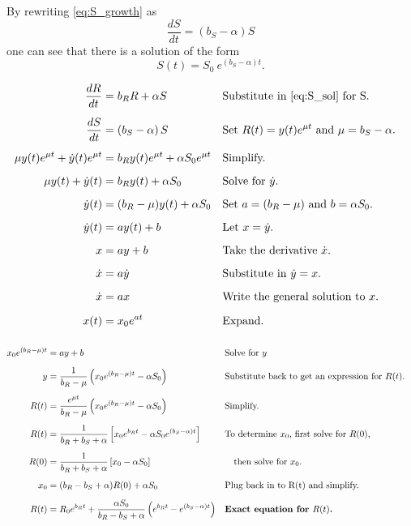\documentclass[oneside]{labbook}
\begin{document}
By rewriting \eqref{eq:S_growth} as
\begin{equation*}
\frac{dS}{dt} = \left( b_S - \alpha \right) S
\end{equation*}
one can see that there is a solution of the form
\begin{equation}\label{eq:S_sol}
S(t) = S_0\:e^{\left(b_S - \alpha\right) t}.
\end{equation}


\begin{align*}
  \frac{dR}{dt} &= b_R R + \alpha S  &&
      \text{Substitute in \eqref{eq:S_sol} for S.} &\\[1.25ex]
  \frac{dS}{dt} &= \left( b_S - \alpha \right) S &&
      \text{Set } R(t)=y(t)e^{\mu t} \text{ and } \mu = b_S - \alpha. &\\[1.25ex]
  \mu y(t) e^{\mu t} + \dot{y}(t) e^{\mu t} &= b_R y(t) e^{\mu t} + \alpha S_0 e^{\mu t} &&
      \text{Simplify.} &\\[1.25ex]
  \mu y(t) + \dot{y}(t) &= b_R y(t) + \alpha S_0 &&
      \text{Solve for } \dot{y}. &\\[1.25ex]
  \dot{y}(t) &= (b_R - \mu) y(t) + \alpha S_0 &&
      \text{Set } a = (b_R - \mu) \text{ and } b = \alpha S_0. &\\[1.25ex]
  \dot{y}(t) &= a y(t) + b &&
      \text{Let } x = \dot{y}. &\\[1.25ex]
  x &= ay + b &&
      \text{Take the derivative }\dot{x}. &\\[1.25ex]
  \dot{x} &= a \dot{y} &&
      \text{Substitute in } \dot{y} = x. &\\[1.25ex]
  \dot{x} &= a x &&
      \text{Write the general solution to } x.&\\[1.25ex]
  x(t) &= x_0 e^{a t} &&
      \text{Expand.} &\\[1.25ex]
\end{align*}

\begin{align*}
  x_0 e^{(b_R - \mu) t} &= ay + b&&
      \text{Solve for } y &\\[1.25ex]
  y &= \frac{1}{b_R - \mu} \left(x_0 e^{(b_R - \mu)t} - \alpha S_0\right) &&
      \text{Substitute back to get an expression for } R(t). &\\[1.25ex]
  R(t) &= \frac{e^{\mu t} }{b_R - \mu} \left( x_0 e^{(b_R - \mu)t} - \alpha S_0 \right) &&
      \text{Simplify.} &\\[1.25ex]
  R(t) &= \frac{1}{b_R + b_S + \alpha} \left[ x_0 e^{b_R t} - \alpha S_0 e^{(b_S - \alpha)t} \right]&&
      \text{To determine $x_0$, first solve for $R(0)$,} &\\[1.25ex]
  R(0) &= \frac{1}{b_R + b_S + \alpha} \left[ x_0 - \alpha S_0 \right] &&
      \text{\quad then solve for } x_0. &\\[1.25ex]
  x_0 &= (b_R - b_S + \alpha) R(0) + \alpha S_0 &&
      \text{Plug back in to R(t) and simplify.} &\\[1.25ex]
  R(t) &= R_0 e^{b_R t} + \frac{\alpha S_0}{b_R - b_S + \alpha} \left(e^{b_R t} - e^{(b_S - \alpha)t} \right) &&
      \textbf{Exact equation for $R(t)$.} &\\[1.25ex]
\end{align*}
\end{document}
